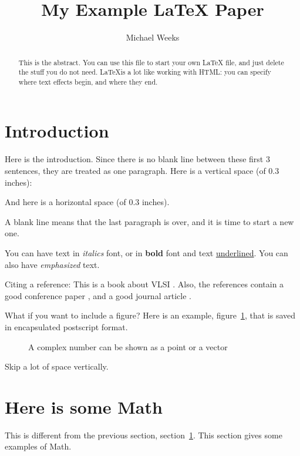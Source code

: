 \documentclass{article}
\begin{document}
\title{My Example LaTeX Paper}
\author{Michael Weeks}
\maketitle

\textheight{7.62in}

\begin{abstract}
This is the abstract. You can use this file to start your own LaTeX file,
and just delete the stuff you do not need. \LaTeX is a lot like working
with HTML: you can specify where text effects begin, and where they end.
\end{abstract}

\section{Introduction}\label{sec:intro}
Here is the introduction.
Since there is no blank line between these first 3 sentences, they are
treated as one paragraph.
Here is a vertical space (of 0.3 inches):
\vspace{.3in}

And here is a \hspace{.3in}horizontal space (of 0.3 inches).

A blank line means that the last paragraph is over, and it is time to start
a new one.

You can have text in \textit{italics} font, or in \textbf{bold} font and 
text \underline{underlined}. You can also have \emph{emphasized} text.


Citing a reference: This is a book about VLSI \cite{Weste93}.
Also, the references contain a good conference paper \cite{LiY88},
and a good journal article \cite{BiS92}.

What if you want to include a figure?
Here is an example, figure~\ref{fig:phasor1}, that is saved in
encapsulated postscript format.

\begin{figure}
  \centering
  \caption{A complex number can be shown as a point or a vector}
  \label{fig:phasor1}
\end{figure}


Skip a lot of space \bigskip vertically.

\section{Here is some Math}\label{sec:math}
This is different from the previous section, section~\ref{sec:intro}.
This section gives some examples of Math.
\end{document}

